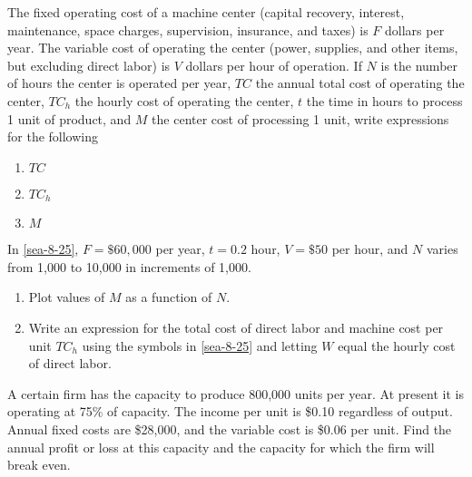 \begin{exercises}
    \begin{exercise}
    \label{sea-8-25}
        The fixed operating cost of a machine center (capital recovery, interest, maintenance, space charges, supervision, insurance, and taxes) is $F$ dollars per year. The variable cost of operating the center (power, supplies, and other items, but excluding direct labor) is $V$ dollars per hour of operation. If $N$ is the number of hours the center is operated per year, $TC$ the annual total cost of operating the center, $TC_h$ the hourly cost of operating the center, $t$ the time in hours to process 1 unit of product, and $M$ the center cost of processing 1 unit, write expressions for the following
        \begin{enumerate}[label=\alph*)]
            \item $TC$
            \item $TC_h$
            \item $M$
        \end{enumerate}
    \end{exercise}
    \begin{solution}
    \end{solution}
    
    \begin{exercise}
    \label{sea-8-26}
        In \ref{sea-8-25}, $F=\$60,000$ per year, $t=0.2$ hour, $V=\$50$ per hour, and $N$ varies from 1,000 to 10,000 in increments of 1,000.
        \begin{enumerate}[label=\alph*)]
            \item Plot values of $M$ as a function of $N$.
            \item Write an expression for the total cost of direct labor and machine cost per unit $TC_h$ using the symbols in \ref{sea-8-25} and letting $W$ equal the hourly cost of direct labor.
        \end{enumerate}
    \end{exercise}
    \begin{solution}
    \end{solution}
    
    \begin{exercise}
    \label{sea-8-27}
        A certain firm has the capacity to produce 800,000 units per year. At present it is operating at 75\% of capacity. The income per unit is \$0.10 regardless of output. Annual fixed costs are \$28,000, and the variable cost is \$0.06 per unit. Find the annual profit or loss at this capacity and the capacity for which the firm will break even.
    \end{exercise}
    \begin{solution}
    \end{solution}
    

\end{exercises}

